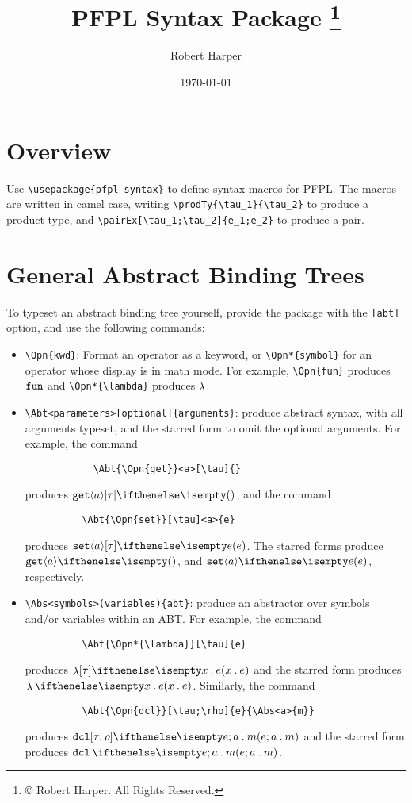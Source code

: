 \documentclass[11pt]{article}
\title{\textsf{PFPL} Syntax Package%
\footnote{\copyright{} \the\year{} Robert Harper.  All Rights Reserved.}}
\author{Robert Harper}
\date{\today}
\begin{document}
\maketitle{}

\section*{Overview}

Use \verb|\usepackage{pfpl-syntax}| to define syntax macros for \textsf{PFPL}.  The macros are written in camel case, writing \verb|\prodTy{\tau_1}{\tau_2}| to produce a product type, and \verb|\pairEx[\tau_1;\tau_2]{e_1;e_2}| to produce a pair.

\section*{General Abstract Binding Trees}

To typeset an abstract binding tree yourself, provide the package with the \verb|[abt]| option, and use the following commands:
\begin{itemize}
  \item \verb|\Opn{kwd}|: Format an operator as a keyword, or \verb|\Opn*{symbol}| for an operator whose display is in math mode.  For example, \verb|\Opn{fun}| produces $\Opn{fun}$ and \verb|\Opn*{\lambda}| produces $\Opn*{\lambda}$.

  \item \verb|\Abt<parameters>[optional]{arguments}|: produce abstract syntax, with all arguments typeset, and the starred form to omit the optional arguments.
        For example, the command
        \begin{verbatim}
            \Abt{\Opn{get}}<a>[\tau]{}
        \end{verbatim}
        produces $\Abt{\Opn{get}}<a>[\tau]{}$, and the command
        \begin{verbatim}
          \Abt{\Opn{set}}[\tau]<a>{e}
        \end{verbatim}
        produces $\Abt{\Opn{set}}<a>[\tau]{e}$.  The starred forms produce $\Abt*{\Opn{get}}<a>[\tau]{}$, and $\Abt*{\Opn{set}}<a>[\tau]{e}$, respectively.

  \item \verb|\Abs<symbols>(variables){abt}|: produce an abstractor over symbols and/or variables within an ABT.  For example, the command
        \begin{verbatim}
          \Abt{\Opn*{\lambda}}[\tau]{e}
        \end{verbatim}
        produces $\Abt{\Opn*{\lambda}}[\tau]{\Abs(x){e}}$ and the starred form produces $\Abt*{\Opn*{\lambda}}[\tau]{\Abs(x){e}}$.  Similarly, the command
        \begin{verbatim}
          \Abt{\Opn{dcl}}[\tau;\rho]{e}{\Abs<a>{m}}
        \end{verbatim}
        produces $\Abt{\Opn{dcl}}[\tau;\rho]{e;\Abs<a>{m}}$ and the starred form produces $\Abt*{\Opn{dcl}}[\tau\,\rho]{e;\Abs<a>{m}}$.
\end{itemize}
\end{document}
